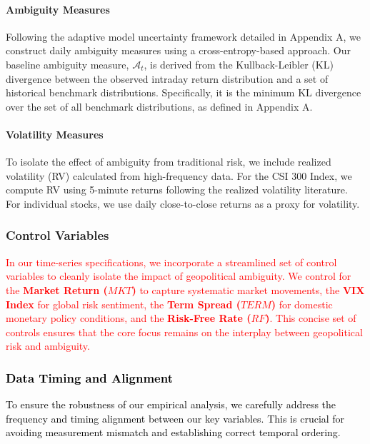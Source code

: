 \documentclass[preprint,12pt,authoryear]{elsarticle}
\begin{document}
\paragraph{Ambiguity Measures}
Following the adaptive model uncertainty framework detailed in Appendix A, we construct daily ambiguity measures using a cross-entropy-based approach. Our baseline ambiguity measure, $\mathcal{A}_t$, is derived from the Kullback-Leibler (KL) divergence between the observed intraday return distribution and a set of historical benchmark distributions. Specifically, it is the minimum KL divergence over the set of all benchmark distributions, as defined in Appendix A.


\paragraph{Volatility Measures}
To isolate the effect of ambiguity from traditional risk, we include realized volatility (RV) calculated from high-frequency data. For the CSI 300 Index, we compute RV using 5-minute returns following the realized volatility literature. For individual stocks, we use daily close-to-close returns as a proxy for volatility.

\subsubsection{Control Variables}

\textcolor{red}{In our time-series specifications, we incorporate a streamlined set of control variables to cleanly isolate the impact of geopolitical ambiguity. We control for the \textbf{Market Return ($MKT$)} to capture systematic market movements, the \textbf{VIX Index} for global risk sentiment, the \textbf{Term Spread ($TERM$)} for domestic monetary policy conditions, and the \textbf{Risk-Free Rate ($RF$)}. This concise set of controls ensures that the core focus remains on the interplay between geopolitical risk and ambiguity.}

\subsubsection{\textcolor{black}{Data Timing and Alignment}}
\textcolor{black}{To ensure the robustness of our empirical analysis, we carefully address the frequency and timing alignment between our key variables. This is crucial for avoiding measurement mismatch and establishing correct temporal ordering.}
\end{document}
